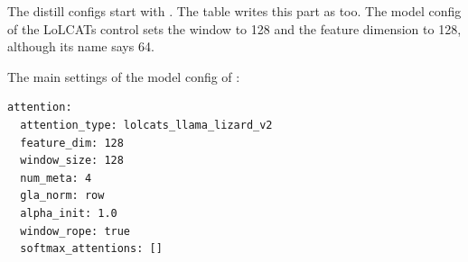 The distill configs start with . The table writes this part as  too. The model config of the LoLCATs control sets the window to 128 and the feature dimension to 128, although its name says 64.

The main settings of the model config of :
\begin{verbatim}
attention:
  attention_type: lolcats_llama_lizard_v2
  feature_dim: 128
  window_size: 128
  num_meta: 4
  gla_norm: row
  alpha_init: 1.0
  window_rope: true
  softmax_attentions: []
\end{verbatim}
